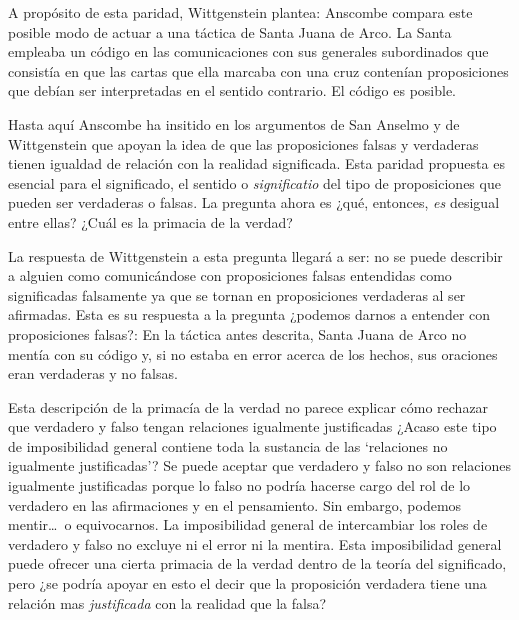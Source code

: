 A propósito de esta paridad, Wittgenstein plantea: 
Anscombe compara este posible modo de actuar a una táctica de Santa Juana de
Arco. La Santa empleaba un código en las comunicaciones con sus generales
subordinados que consistía en que las cartas que ella marcaba con una cruz
contenían proposiciones que debían ser interpretadas en el sentido contrario. El
código es posible.

Hasta aquí Anscombe ha insitido en los argumentos de San Anselmo y de
Wittgenstein que apoyan la idea de que las proposiciones falsas y verdaderas
tienen igualdad de relación con la realidad significada. Esta paridad propuesta
es esencial para el significado, el sentido o \emph{significatio} del tipo de
proposiciones que pueden ser verdaderas o falsas. La pregunta ahora es ¿qué,
entonces, \emph{es} desigual entre ellas? ¿Cuál es la primacia de la verdad?

La respuesta de Wittgenstein a esta pregunta llegará a ser: no se puede
describir a alguien como comunicándose con proposiciones falsas entendidas como
significadas falsamente ya que se tornan en proposiciones verdaderas al ser
afirmadas. Esta es su respuesta a la pregunta ¿podemos darnos a entender con
proposiciones falsas?:  En la
táctica antes descrita, Santa Juana de Arco no mentía con su código y, si no
estaba en error acerca de los hechos, sus oraciones eran verdaderas y no falsas.

Esta descripción de la primacía de la verdad no parece explicar cómo rechazar
que verdadero y falso tengan relaciones igualmente justificadas ¿Acaso este tipo
de imposibilidad general contiene toda la sustancia de las `relaciones no
igualmente justificadas'? Se puede aceptar que verdadero y falso no son
relaciones igualmente justificadas porque lo falso no podría hacerse cargo del
rol de lo verdadero en las afirmaciones y en el pensamiento. Sin embargo,
podemos mentir\ldots\, o equivocarnos. La imposibilidad general de intercambiar
los roles de verdadero y falso no excluye ni el error ni la mentira. Esta
imposibilidad general puede ofrecer una cierta primacia de la verdad dentro de
la teoría del significado, pero ¿se podría apoyar en esto el decir que la
proposición verdadera tiene una relación mas \emph{justificada} con la realidad
que la falsa?

